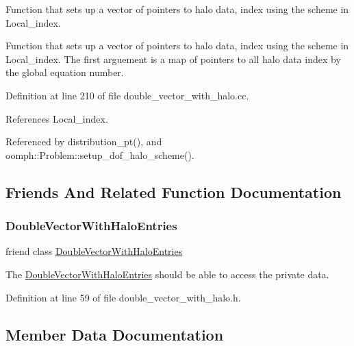 Function that sets up a vector of pointers to halo data, index using the scheme in Local\+\_\+index. 

Function that sets up a vector of pointers to halo data, index using the scheme in Local\+\_\+index. The first arguement is a map of pointers to all halo data index by the global equation number. 

Definition at line 210 of file double\+\_\+vector\+\_\+with\+\_\+halo.\+cc.



References Local\+\_\+index.



Referenced by distribution\+\_\+pt(), and oomph\+::\+Problem\+::setup\+\_\+dof\+\_\+halo\+\_\+scheme().



\subsection{Friends And Related Function Documentation}
\mbox{\label{classoomph_1_1DoubleVectorHaloScheme_acae5914031232d05e22888b081f2598f}} 
\subsubsection{\texorpdfstring{Double\+Vector\+With\+Halo\+Entries}{DoubleVectorWithHaloEntries}}
{\footnotesize\ttfamily friend class \hyperlink{classoomph_1_1DoubleVectorWithHaloEntries}{Double\+Vector\+With\+Halo\+Entries}\hspace{0.3cm}{\ttfamily [friend]}}



The \hyperlink{classoomph_1_1DoubleVectorWithHaloEntries}{Double\+Vector\+With\+Halo\+Entries} should be able to access the private data. 



Definition at line 59 of file double\+\_\+vector\+\_\+with\+\_\+halo.\+h.



\subsection{Member Data Documentation}
\mbox{\label{classoomph_1_1DoubleVectorHaloScheme_a4c3aa7f9d1da907fdbacf79c36355004}} 

